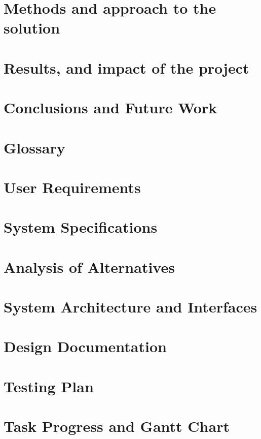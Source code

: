 \documentclass[12pt]{article}
\begin{document}
\section{Methods and approach to the solution}
\section{Results, and impact of the project}
\section{Conclusions and Future Work}


\appendix
\section{Glossary}
\section{User Requirements}
\section{System Specifications}
\section{Analysis of Alternatives}
\section{System Architecture and Interfaces}
\section{Design Documentation}
\section{Testing Plan}
\section{Task Progress and Gantt Chart}
\end{document}
